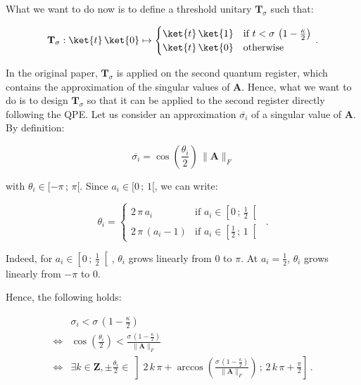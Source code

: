 \documentclass[11pt, a4paper]{article}
\begin{document}
            What we want to do now is to define a threshold unitary \(\mathbf{T}_\sigma\) such that:
            
            \[\mathbf{T}_\sigma:\ket{t}\,\ket{0}\mapsto\begin{cases}\ket{t}\,\ket{1} &\text{if } t < \sigma\,\left(1-\frac\kappa2\right)\\\ket{t}\,\ket{0}&\text{otherwise}\end{cases}\,.\]
            
            In the original paper, \(\mathbf{T}_\sigma\) is applied on the second quantum register, which contains the approximation of the singular values of \(\mathbf{A}\). Hence, what we want to do is to design \(\mathbf{T}_\sigma\) so that it can be applied to the second register directly following the QPE. Let us consider an approximation \(\overline{\sigma_i}\) of a singular value of \(\mathbf{A}\). By definition:
            
            \[\overline{\sigma_i}=\cos\left(\frac{\theta_i}{2}\right)\,\|\mathbf{A}\|_F\]
            
            with \(\theta_i\in[-\pi\,;\,\pi[\). Since \(a_i\in[0\,;\,1[\), we can write:
            
            \[\theta_i = \begin{cases}2\,\pi\,a_i&\text{if }a_i\in\left[0\,;\,\frac12\right[\\2\,\pi\,\left(a_i-1\right)&\text{if }a_i\in\left[\frac12\,;\,1\right[\end{cases}\,.\]
            
            Indeed, for \(a_i\in\left[0\,;\,\frac12\right[\), \(\theta_i\) grows linearly from \(0\) to \(\pi\). At \(a_i=\frac12\), \(\theta_i\) grows linearly from \(-\pi\) to \(0\).
            
            Hence, the following holds:
            
            \begin{align*}
                &\sigma_i < \sigma\,\left(1 - \frac\kappa2\right)\\
                \iff&\cos\left(\frac{\theta_i}{2}\right) < \frac{\sigma\,\left(1 - \frac\kappa2\right)}{\|\mathbf{A}\|_F}\\
                \iff&\exists k\in\mathbf{Z},\pm\frac{\theta_i}{2}\in\left]2\,k\,\pi + \arccos\left(\frac{\sigma\,\left(1 - \frac\kappa2\right)}{\|\mathbf{A}\|_F}\right)\,;\,2\,k\,\pi + \frac\pi2\right]\,.
            \end{align*}
            
\end{document}
